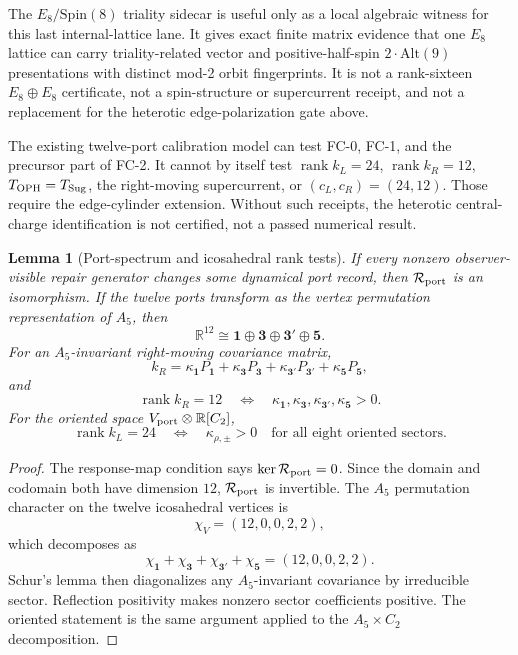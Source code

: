 \documentclass[11pt]{article}
\newtheorem{lemma}[theorem]{Lemma}
\theoremstyle{remark}
\theoremstyle{plain}
\newcommand{\OPH}{\mathrm{OPH}}
\newcommand{\calR}{\mathcal R}
\begin{document}
The \(E_8/\mathrm{Spin}(8)\) triality sidecar is useful only as a local algebraic witness for this
last internal-lattice lane. It gives exact finite matrix evidence that one \(E_8\) lattice can carry
triality-related vector and positive-half-spin \(2\!\cdot\!\mathrm{Alt}(9)\) presentations with
distinct mod-2 orbit fingerprints. It is not a rank-sixteen \(E_8\oplus E_8\) certificate, not a
spin-structure or supercurrent receipt, and not a replacement for the heterotic edge-polarization
gate above.

The existing twelve-port calibration model can test FC-0, FC-1, and the precursor part of FC-2. It cannot
by itself test \(\operatorname{rank}k_L=24\), \(\operatorname{rank}k_R=12\), \(T_{\OPH}=T_{\rm Sug}\),
the right-moving supercurrent, or \((c_L,c_R)=(24,12)\). Those require the edge-cylinder extension.
Without such receipts, the heterotic central-charge identification is not certified,
not a passed numerical result.

\begin{lemma}[Port-spectrum and icosahedral rank tests]
If every nonzero observer-visible repair generator changes some dynamical port record, then
\(\calR_{\rm port}\) is an isomorphism. If the twelve ports transform as the vertex permutation
representation of \(A_5\), then
\[
\mathbb R^{12}\cong\mathbf1\oplus\mathbf3\oplus\mathbf3'\oplus\mathbf5.
\]
For an \(A_5\)-invariant right-moving covariance matrix,
\[
k_R=\kappa_{\mathbf1}P_{\mathbf1}
+\kappa_{\mathbf3}P_{\mathbf3}
+\kappa_{\mathbf3'}P_{\mathbf3'}
+\kappa_{\mathbf5}P_{\mathbf5},
\]
and
\[
\operatorname{rank}k_R=12
\quad\Longleftrightarrow\quad
\kappa_{\mathbf1},\kappa_{\mathbf3},\kappa_{\mathbf3'},\kappa_{\mathbf5}>0.
\]
For the oriented space \(V_{\rm port}\otimes\mathbb R[C_2]\),
\[
\operatorname{rank}k_L=24
\quad\Longleftrightarrow\quad
\kappa_{\rho,\pm}>0
\quad\text{for all eight oriented sectors.}
\]
\end{lemma}

\begin{proof}
The response-map condition says \(\ker\calR_{\rm port}=0\). Since the domain and codomain both
have dimension \(12\), \(\calR_{\rm port}\) is invertible. The \(A_5\) permutation character on the
twelve icosahedral vertices is
\[
\chi_V=(12,0,0,2,2),
\]
which decomposes as
\[
\chi_{\mathbf1}+\chi_{\mathbf3}+\chi_{\mathbf3'}+\chi_{\mathbf5}
=(12,0,0,2,2).
\]
Schur's lemma then diagonalizes any \(A_5\)-invariant covariance by irreducible sector. Reflection
positivity makes nonzero sector coefficients positive. The oriented statement is the same argument
applied to the \(A_5\times C_2\) decomposition.
\end{proof}
\end{document}

